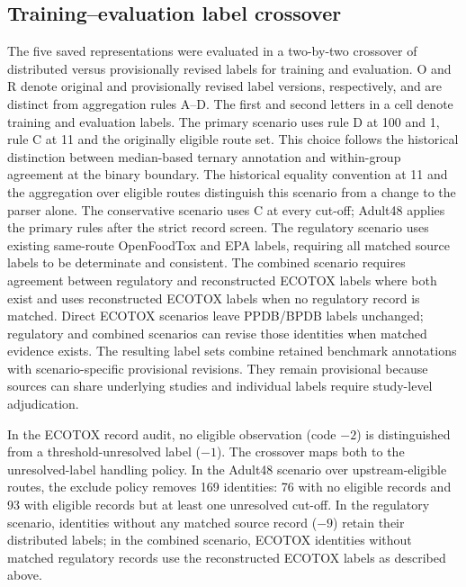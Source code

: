 \documentclass[10pt]{article}
\begin{document}
\subsection*{Training--evaluation label crossover}
The five saved representations were evaluated in a two-by-two crossover of distributed versus provisionally revised labels for training and evaluation. O and R denote original and provisionally revised label versions, respectively, and are distinct from aggregation rules A--D. The first and second letters in a cell denote training and evaluation labels. The primary scenario uses rule D at 100 and 1, rule C at 11 and the originally eligible route set. This choice follows the historical distinction between median-based ternary annotation and within-group agreement at the binary boundary. The historical equality convention at 11 and the aggregation over eligible routes distinguish this scenario from a change to the parser alone. The conservative scenario uses C at every cut-off; Adult48 applies the primary rules after the strict record screen. The regulatory scenario uses existing same-route OpenFoodTox and EPA labels, requiring all matched source labels to be determinate and consistent. The combined scenario requires agreement between regulatory and reconstructed ECOTOX labels where both exist and uses reconstructed ECOTOX labels when no regulatory record is matched. Direct ECOTOX scenarios leave PPDB/BPDB labels unchanged; regulatory and combined scenarios can revise those identities when matched evidence exists. The resulting label sets combine retained benchmark annotations with scenario-specific provisional revisions. They remain provisional because sources can share underlying studies and individual labels require study-level adjudication.

In the ECOTOX record audit, no eligible observation (code \(-2\)) is distinguished from a threshold-unresolved label (\(-1\)). The crossover maps both to the unresolved-label handling policy. In the Adult48 scenario over upstream-eligible routes, the exclude policy removes 169 identities: 76 with no eligible records and 93 with eligible records but at least one unresolved cut-off. In the regulatory scenario, identities without any matched source record (\(-9\)) retain their distributed labels; in the combined scenario, ECOTOX identities without matched regulatory records use the reconstructed ECOTOX labels as described above.
\end{document}
